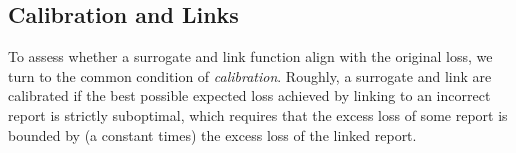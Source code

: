 \documentclass[11pt]{article}
\newcommand{\Comments}{1}
\newcommand{\mynote}[2]{\ifnum\Comments=1\textcolor{#1}{#2}\fi}
\newcommand{\raf}[1]{\mynote{darkgreen}{[RF: #1]}}
\newcommand{\reals}{\mathbb{R}}
\newcommand{\simplex}{\Delta_\Y}
\newcommand{\R}{\mathcal{R}}
\newcommand{\X}{\mathcal{X}}
\newcommand{\Y}{\mathcal{Y}}
\newcommand{\inprod}[2]{\langle #1, #2 \rangle}%
\newtheorem{definition}{Definition}
\begin{document}
\subsection{Calibration and Links}
\label{subsec:calibration-links}


To assess whether a surrogate and link function align with the original loss, we turn to the common condition of \emph{calibration}.
Roughly, a surrogate and link are calibrated if the best possible expected loss achieved by linking to an incorrect report is strictly suboptimal, which requires that the excess loss of some report is bounded by (a constant times) the excess loss of the linked report.


\end{document}
